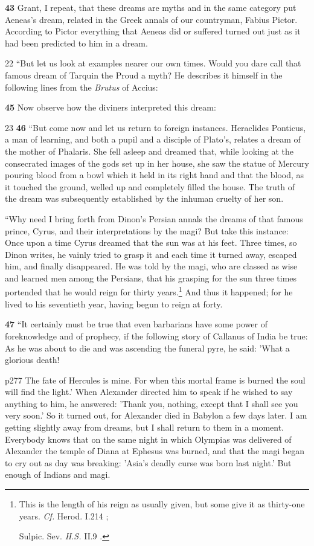 \textbf{43} Grant, I repeat, that these dreams are myths and in the same category put Aeneas's dream, related in the Greek annals of our countryman, Fabius Pictor. According to Pictor everything that Aeneas did or suffered turned out just as it had been predicted to him in a dream.

22
``But let us look at examples nearer our own times. Would you dare call that famous dream of Tarquin the Proud a myth? He describes it himself in the following lines from the \emph{Brutus} of Accius:

\textbf{45} Now observe how the diviners interpreted this dream:

23
\textbf{46} ``But come now and let us return to foreign instances. Heraclides Ponticus, a man of learning, and both a pupil and a disciple of Plato's, relates a dream of the mother of Phalaris. She fell asleep and dreamed that, while looking at the consecrated images of the gods set up in her house, she saw the statue of Mercury pouring blood from a bowl which it held in its right hand and that the blood, as it touched the ground, welled up and completely filled the house. The truth of the dream was subsequently established by the inhuman cruelty of her son.

``Why need I bring forth from Dinon's Persian annals the dreams of that famous prince, Cyrus, and their interpretations by the magi? But take this instance: Once upon a time Cyrus dreamed that the sun was at his feet. Three times, so Dinon writes, he vainly tried to grasp it and each time it turned away, escaped him, and finally disappeared. He was told by the magi, who are classed as wise and learned men among the Persians, that his grasping for the sun three times portended that he would reign for thirty years.\texthebrew{}\footnote{This is the length of his reign as usually given, but some give it as thirty-one years. \emph{Cf.} Herod. I.214 ;

Sulpic. Sev. \emph{H.S.} II.9 .

} And thus it happened; for he lived to his seventieth year, having begun to reign at forty.

\textbf{47} ``It certainly must be true that even barbarians have some power of foreknowledge and of prophecy, if the following story of Callanus of India be true: As he was about to die and was ascending the funeral pyre, he said: 'What a glorious death!

p277 The fate of Hercules is mine. For when this mortal frame is burned the soul will find the light.' When Alexander directed him to speak if he wished to say anything to him, he answered: 'Thank you, nothing, except that I shall see you very soon.' So it turned out, for Alexander died in Babylon a few days later. I am getting slightly away from dreams, but I shall return to them in a moment. Everybody knows that on the same night in which Olympias was delivered of Alexander the temple of Diana at Ephesus was burned, and that the magi began to cry out as day was breaking: 'Asia's deadly curse was born last night.' But enough of Indians and magi.

